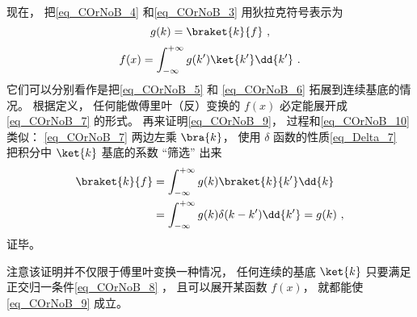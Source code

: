 现在， 把\autoref{eq_COrNoB_4}  和\autoref{eq_COrNoB_3} 用狄拉克符号表示为
\begin{equation}\label{eq_COrNoB_9}
g(k) = \braket{k}{f}~,
\end{equation}
\begin{equation}\label{eq_COrNoB_7}
f(x) = \int_{-\infty}^{+\infty} g(k') \ket{k'} \dd{k'}~.
\end{equation}
它们可以分别看作是把\autoref{eq_COrNoB_5} 和 \autoref{eq_COrNoB_6} 拓展到连续基底的情况。 根据定义， 任何能做傅里叶（反）变换的 $f(x)$ 必定能展开成\autoref{eq_COrNoB_7} 的形式。 再来证明\autoref{eq_COrNoB_9}， 过程和\autoref{eq_COrNoB_10} 类似： \autoref{eq_COrNoB_7} 两边左乘 $\bra{k}$， 使用 $\delta$ 函数的性质\autoref{eq_Delta_7}~ 把积分中 $\ket{k}$ 基底的系数 “筛选” 出来
\begin{equation}
\begin{aligned}
\braket{k}{f} &= \int_{-\infty}^{+\infty} g(k) \braket{k}{k'} \dd{k}\\
&= \int_{-\infty}^{+\infty} g(k) \delta(k-k') \dd{k'}
= g(k)~,
\end{aligned}
\end{equation}
证毕。

注意该证明并不仅限于傅里叶变换一种情况， 任何连续的基底 $\ket{k}$ 只要满足正交归一条件\autoref{eq_COrNoB_8} ， 且可以展开某函数 $f(x)$， 就都能使\autoref{eq_COrNoB_9} 成立。
